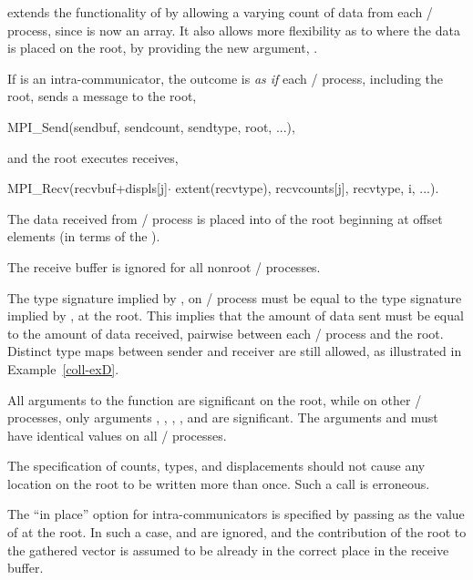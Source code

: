  extends the functionality of 
by allowing a varying count of data from each \MPI/ process, since
is now an array.  It also allows more flexibility as to where the data
is placed on the root, by providing the new argument, .

If  is an intra-communicator,
the outcome is \emph{as if} each \MPI/ process, including the root,
sends a message to the root,
\begin{mpicodeblock}
MPI\_Send(sendbuf, sendcount, sendtype, root, ...),
\end{mpicodeblock}
\noindent and the root executes  receives,
\begin{mpicodeblock}
MPI\_Recv(recvbuf+displs[j]$\cdot$ extent(recvtype), recvcounts[j],
recvtype, i, ...).
\end{mpicodeblock}

The
data received from \MPI/ process  is placed into  of the root
beginning at offset  elements (in terms of the
).

The receive buffer is ignored for all nonroot \MPI/ processes.

The type signature implied by ,  on \MPI/ process 
must be equal to the type signature implied by , 
at the root.
This implies that the amount of data sent must be equal to the
amount of data received, pairwise between each \MPI/ process and the root.
Distinct type maps between sender and receiver are still allowed,
as illustrated in Example~\ref{coll-exD}.

All arguments to the function are significant on the root,
while on other \MPI/ processes, only arguments , ,
, ,
and
 are significant.
The arguments  and 
must have identical values on all \MPI/ processes.

The specification of counts, types, and displacements
should not cause any location on the root to be written more than
once.  Such a call is erroneous.

The ``in place'' option  for intra-communicators is specified by passing
 as
the value of  at the root.  In such a case,
 and  are ignored, and the
contribution of the root to the gathered vector is assumed to be already
in the correct place in the receive buffer.

